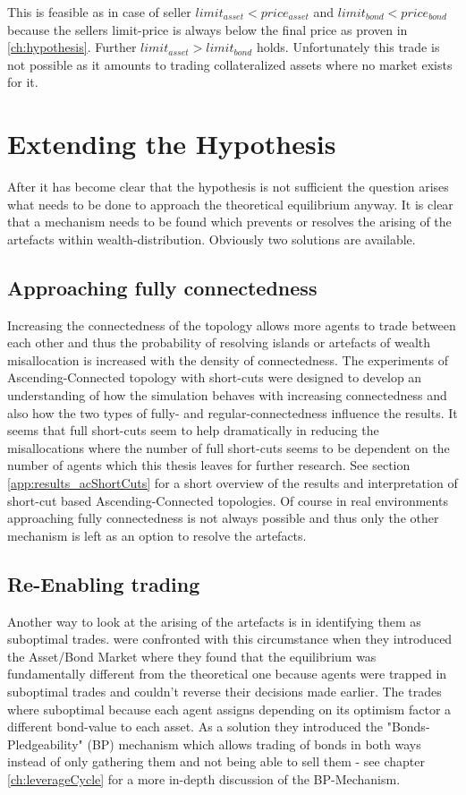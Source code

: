 \documentclass[Bachelorarbeit.tex]{subfiles}
\begin{document}
This is feasible as in case of seller $limit_{asset} < price_{asset}$ and $limit_{bond} < price_{bond}$ because the sellers limit-price is always below the final price as proven in \ref{ch:hypothesis}. Further $limit_{asset} > limit_{bond}$ holds. Unfortunately this trade is not possible as it amounts to trading collateralized assets where no market exists for it.

\section{Extending the Hypothesis}
After it has become clear that the hypothesis is not sufficient the question arises what needs to be done to approach the theoretical equilibrium anyway. It is clear that a mechanism needs to be found which prevents or resolves the arising of the artefacts within wealth-distribution. Obviously two solutions are available.

\subsection{Approaching fully connectedness}
Increasing the connectedness of the topology allows more agents to trade between each other and thus the probability of resolving islands or artefacts of wealth misallocation is increased with the density of connectedness. The experiments of Ascending-Connected topology with short-cuts were designed to develop an understanding of how the simulation behaves with increasing connectedness and also how the two types of  fully- and regular-connectedness influence the results. It seems that full short-cuts seem to help dramatically in reducing the misallocations where the number of full short-cuts seems to be dependent on the number of agents which this thesis leaves for further research. See section \ref{app:results_acShortCuts} for a short overview of the results and interpretation of short-cut based Ascending-Connected topologies.
\linebreak
Of course in real environments approaching fully connectedness is not always possible and thus only the other mechanism is left as an option to resolve the artefacts.

\subsection{Re-Enabling trading}
\label{ch:interpretation_reenablingTrading}
Another way to look at the arising of the artefacts is in identifying them as suboptimal trades. \cite{Breuer2015} were confronted with this circumstance when they introduced the Asset/Bond Market where they found that the equilibrium was fundamentally different from the theoretical one because agents were trapped in suboptimal trades and couldn't reverse their decisions made earlier. The trades where suboptimal because each agent assigns depending on its optimism factor a different bond-value to each asset. As a solution they introduced the "Bonds-Pledgeability" (BP) mechanism which allows trading of bonds in both ways instead of only gathering them and not being able to sell them - see chapter \ref{ch:leverageCycle} for a more in-depth discussion of the BP-Mechanism.
\end{document}
